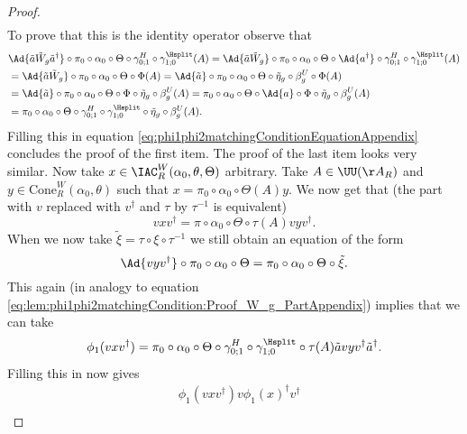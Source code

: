 \begin{proof}
\begin{align}
	\end{align}
	To prove that this is the identity operator observe that
	\begin{align}
		\nonumber
		&\Ad{\tilde{a}\tilde{W}_g\tilde{a}^\dagger}\circ\pi_0\circ\alpha_0\circ\Theta\circ \gamma^{H}_{0;1}\circ\gamma^{\Hsplit}_{1;0}(A)=\Ad{\tilde{a}\tilde{W}_g}\circ\pi_0\circ\alpha_0\circ\Theta\circ\Ad{a^\dagger}\circ \gamma^{H}_{0;1}\circ\gamma^{\Hsplit}_{1;0}(A)\\
		&=\Ad{\tilde{a}\tilde{W}_g}\circ\pi_0\circ\alpha_0\circ\Theta\circ\Phi(A)=\Ad{\tilde{a}}\circ\pi_0\circ\alpha_0\circ\Theta\circ\tilde{\eta}_g\circ\beta_g^U\circ\Phi(A)\\
		\nonumber
		&=\Ad{\tilde{a}}\circ\pi_0\circ\alpha_0\circ\Theta\circ\Phi\circ\tilde{\eta}_g\circ\beta_g^U(A)=\pi_0\circ\alpha_0\circ\Theta\circ\Ad{a}\circ\Phi\circ\tilde{\eta}_g\circ\beta_g^U(A)\\
		\nonumber
		&=\pi_0\circ\alpha_0\circ\Theta\circ \gamma^{H}_{0;1}\circ\gamma^{\Hsplit}_{1;0} \circ\tilde{\eta}_g\circ\beta_g^U(A).
	\end{align}
	Filling this in equation \eqref{eq:phi1phi2matchingConditionEquationAppendix} concludes the proof of the first item. The proof of the last item looks very similar. Now take $x\in \IAC_R^W(\alpha_0,\theta,\Theta)$ arbitrary. Take $A\in\UU(\AA_R)$ and $y\in\text{Cone}_R^W(\alpha_0,\theta)$ such that $x=\pi_0\circ\alpha_0\circ\Theta(A)y$. We now get that (the part with $v$ replaced with $v^\dagger$ and $\tau$ by $\tau^{-1}$ is equivalent)
	\begin{equation}
		vxv^\dagger=\pi\circ\alpha_0\circ\Theta\circ\tau(A)vyv^\dagger.
	\end{equation}
	When we now take $\tilde\xi=\tau\circ\xi\circ\tau^{-1}$ we still obtain an equation of the form
	\begin{equation}
		\Ad{vyv^\dagger}\circ \pi_0\circ\alpha_0\circ\Theta=\pi_0\circ\alpha_0\circ\Theta\circ\tilde\xi.
	\end{equation}
	This again (in analogy to equation \eqref{eq:lem:phi1phi2matchingCondition:Proof_W_g_PartAppendix}) implies that we can take
	\begin{equation}
		\phi_1(vxv^\dagger)=\pi_0\circ\alpha_0\circ\Theta\circ\gamma^{H}_{0;1}\circ\gamma^{\Hsplit}_{1;0}\circ\tau(A)\tilde{a}vyv^\dagger\tilde{a}^\dagger.
	\end{equation}
	Filling this in now gives
	\begin{align}
		&\phi_1(vxv^\dagger)v\phi_1(x)^\dagger v^\dagger\\

\end{align}
\end{proof}
